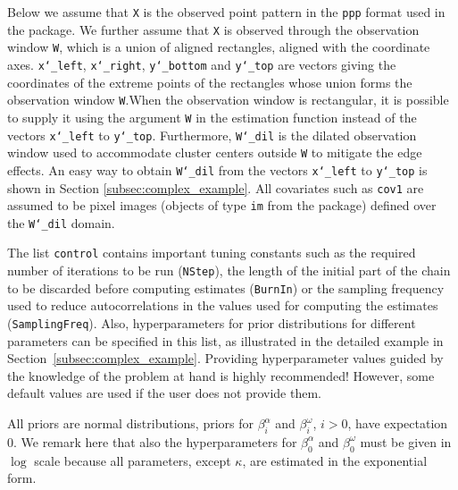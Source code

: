 Below we assume that \texttt{X} is the observed point pattern in the \texttt{ppp} format used in the  package. We further assume that \texttt{X} is observed through the observation window \texttt{W}, which is a union of aligned rectangles, aligned with the coordinate axes. \texttt{x\char`_left}, \texttt{x\char`_right}, \texttt{y\char`_bottom} and \texttt{y\char`_top} are vectors giving the coordinates of the extreme points of the rectangles whose union forms the observation window \texttt{W}.{When the observation window is rectangular, it is possible to supply it using the argument \texttt{W} in the estimation function instead of the vectors \texttt{x\char`_left} to \texttt{y\char`_top}.} Furthermore, \texttt{W\char`_dil} is the dilated observation window used to accommodate cluster centers outside \texttt{W} to mitigate the edge effects. An easy way to obtain \texttt{W\char`_dil} from the vectors \texttt{x\char`_left} to \texttt{y\char`_top} is shown in Section \ref{subsec:complex_example}. All covariates such as \texttt{cov1} are assumed to be pixel images (objects of type \texttt{im} from the  package) defined over the \texttt{W\char`_dil} domain.

The list \texttt{control} contains important tuning constants such as the required number of iterations to be run (\texttt{NStep}), the length of the initial part of the chain to be discarded before computing estimates (\texttt{BurnIn}) or the sampling frequency used to reduce autocorrelations in the values used for computing the estimates (\texttt{SamplingFreq}). Also, hyperparameters for prior distributions for different parameters can be specified in this list, as illustrated in the detailed example in Section~\ref{subsec:complex_example}. Providing hyperparameter values guided by the knowledge of the problem at hand is highly recommended! However, some default values are used if the user does not provide them. 

All priors are normal distributions, priors for $\beta_i^\alpha$ and $\beta_i^\omega$, $i>0$, have expectation 0. We remark here that also the hyperparameters for $\beta_0^\alpha$ and $\beta_0^\omega$ must be given in $\log$ scale because all parameters, except $\kappa$, are estimated in the exponential form.

